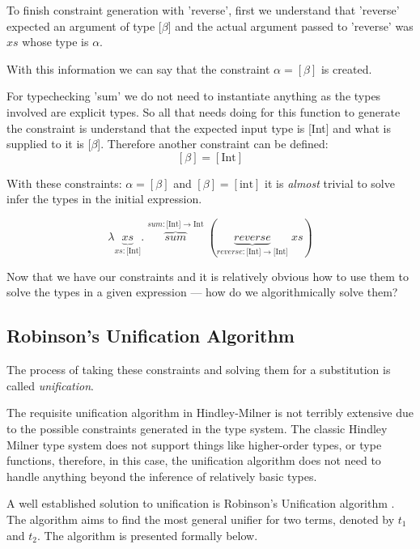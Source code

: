 \documentclass{l4proj}
\begin{document}
To finish constraint generation with 'reverse', first we understand that 'reverse' expected an argument of type [$\beta$] and the actual argument passed to 'reverse' was $xs$ whose type is $\alpha$.

With this information we can say that the constraint $\alpha = [\beta]$ is created.

For typechecking 'sum' we do not need to instantiate anything as the types involved are explicit types.
So all that needs doing for this function to generate the constraint is understand that the expected input type is [Int] and what is supplied to it is [$\beta$].
Therefore another constraint can be defined:
\[[\beta] = [\text{Int}]\]

With these constraints: $\alpha = [\beta]$ and $[\beta] = [\text{int}]$ it is \emph{almost} trivial to solve infer the types in the initial expression.

\[\lambda \underbrace{xs}_{xs : \text{[Int]}} . \; \overbrace{\mathit{sum}}^{sum : \text{[Int]} \rightarrow \text{Int}} \; (\underbrace{\mathit{reverse}}_{reverse : \text{[Int]} \rightarrow \text{[Int]}} \; xs)\]

Now that we have our constraints and it is relatively obvious how to use them to solve the types in a given expression — how do we algorithmically solve them?

\subsection*{Robinson's Unification Algorithm}

The process of taking these constraints and solving them for a substitution is called \emph{unification}\citep{Robinson_1965}.

The requisite unification algorithm in Hindley-Milner is not terribly extensive due to the possible constraints generated in the type system.
The classic Hindley Milner type system does not support things like higher-order types, or type functions, therefore, in this case, the unification algorithm does not need to handle anything beyond the inference of relatively basic types.

A well established solution to unification is Robinson's Unification algorithm \citep{Robinson_1965}.
The algorithm aims to find the most general unifier for two terms, denoted by $t_1$ and $t_2$.
The algorithm is presented formally below.

\end{document}
